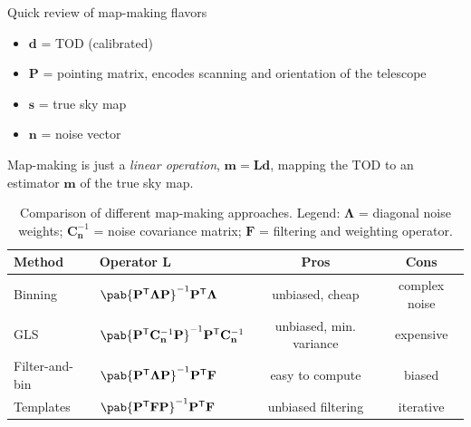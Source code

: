 \documentclass[final]{beamer}
\newcommand{\transpose}[1]{\ensuremath{#1^{\mathsf T}}}
\newlength{\colwidth}
\begin{document}
\begin{frame}[t]
\begin{columns}[t]
\begin{column}{\colwidth}
\begin{alertblock}{Quick review of map-making flavors}
        \begin{itemize}
          \item $\mathbf d$ = TOD (calibrated)
          \item $\mathbf P$ = pointing matrix, encodes scanning and orientation of the telescope
          \item $\mathbf s$ = true sky map
          \item $\mathbf n$ = noise vector
        \end{itemize}

        Map-making is just a \emph{linear operation}, \( \mathbf m = \mathbf{L d} \), mapping the TOD to an estimator $\mathbf m$ of the true sky map.

        \begin{table}
          \centering
          \begin{tabular}{l l c c}
            \toprule
            \textbf{Method} & \textbf{Operator} \(\mathbf L\)                                                                                              & \textbf{Pros}           & \textbf{Cons} \\
            \midrule
            Binning         & \( \pab{\transpose{\mathbf P} \mathbf{\Lambda P}}^{-1} \transpose{\mathbf P} \mathbf \Lambda \)                              & unbiased, cheap         & complex noise \\
            \midrule
            GLS             & \( \pab{\transpose{\mathbf P} \mathbf{C}_\mathbf{n}^{-1} \mathbf P}^{-1} \transpose{\mathbf P} \mathbf{C}_\mathbf{n}^{-1} \) & unbiased, min. variance & expensive     \\
            \midrule
            Filter-and-bin  & \( \pab{\transpose{\mathbf P} \mathbf{\Lambda P}}^{-1} \transpose{\mathbf P} \mathbf F \)                                    & easy to compute         & biased        \\
            \midrule
            Templates       & \( \pab{\transpose{\mathbf P} \mathbf{F P}}^{-1} \transpose{\mathbf P} \mathbf F \)                                          & unbiased filtering      & iterative     \\
            \bottomrule
          \end{tabular}
          \caption{Comparison of different map-making approaches. Legend: \(\mathbf \Lambda\) = diagonal noise weights; \(\mathbf{C}_\mathbf{n}^{-1}\) = noise covariance matrix; \(\mathbf F\) = filtering and weighting operator.}
        \end{table}


\end{alertblock}
\end{column}
\end{columns}
\end{frame}
\end{document}
